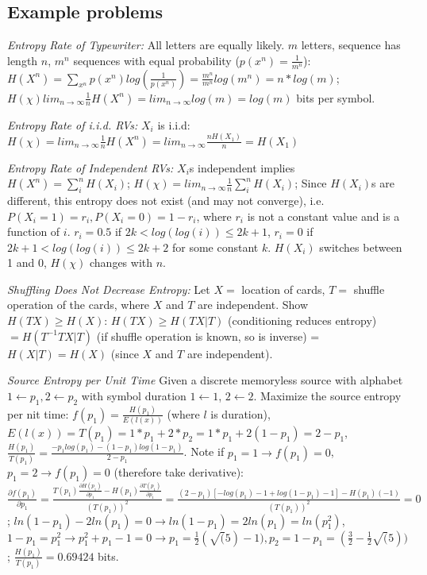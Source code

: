\documentclass[10pt]{article}
\begin{document}
\begin{tiny}
\begin{multicols}{3}
\section*{Example problems}

\textit{Entropy Rate of Typewriter:} 
All letters are equally likely. 
$m$ letters, sequence has length $n$, 
$m^n$ sequences with equal probability ($p(x^n) = \frac{1}{m^n}$): 
$H(X^n) = \sum_{x^n} p(x^n) log(\frac{1}{p(x^n)}) =  \frac{m^n}{m^n}log(m^n) = n*log(m)$; $H(\chi) lim_{n \to \infty} \frac{1}{n} H(X^n) = lim_{n \to \infty} log(m) = log(m)$ bits per symbol.

\textit{Entropy Rate of i.i.d. RVs:} 
$X_i$ is i.i.d: 
$H(\chi) = lim_{n \to \infty} \frac{1}{n} H(X^n) = lim_{n \to \infty} \frac{nH(X_1)}{n} = H(X_1)$

\textit{Entropy Rate of Independent RVs:} 
$X_i$s independent implies $H(X^n) = \sum_i^n H(X_i)$; 
$H(\chi) = lim_{n \to \infty} \frac{1}{n} \sum_i^n H(X_i) $; 
Since $H(X_i)$s are different, 
this entropy does not exist (and may not converge), 
i.e. $P(X_i = 1) = r_i, P(X_i = 0) = 1 - r_i$, 
where $r_i$ is not a constant value and is a function of $i$. 
$r_i = 0.5$ if $2k < log(log(i)) \leq 2k + 1$, $r_i = 0$ if $2k + 1 < log(log(i)) \leq 2k +2 $ for some constant $k$. $H(X_i)$ switches between 1 and 0, $H(\chi)$ changes with $n$.

\textit{Shuffling Does Not Decrease Entropy:} 
Let $X =$ location of cards, $T =$ shuffle operation of the cards, 
where $X$ and $T$ are independent. Show $H(TX) \geq H(X)$: $H(TX) \geq H(TX|T)$ (conditioning reduces entropy) $= H(T^{-1}TX|T)$ (if shuffle operation is known, so is inverse) = $H(X|T) = H(X)$ (since $X$ and $T$ are independent).

\textit{Source Entropy per Unit Time} 
Given a discrete memoryless source with alphabet $1 \gets p_1, 2 \gets p_2$ with symbol duration $1 \gets 1$, $2 \gets 2$. 
Maximize the source entropy per nit time: $f(p_1) = \frac{H(p_1)}{E(l(x))}$ (where $l$ is duration), $E(l(x)) = T(p_1) = 1*p_1 + 2*p_2 = 1*p_1 + 2(1-p_1) = 2 - p_1$, $\frac{H(p_1)}{T(p_1)} = \frac{-p_1 log(p_1) - (1-p_1)log(1-p_1)}{2-p_1}$. Note if $p_1 = 1 \to f(p_1) = 0$, $p_1 = 2 \to f(p_1) = 0$ 
(therefore take derivative): $\frac{\partial f(p_1)}{\partial p_1} = \frac{ T(p_1)\frac{\partial H(p_1)}{\partial p_1} - H(p_1)\frac{\partial T(p_1)}{\partial p_1}}{(T(p_1))^2} = \frac{(2-p_1)[-log(p_1) -1 + log(1-p_1) - 1] - H(p_1)(-1)}{(T(p_1))^2}=0$; $ln(1-p_1) - 2ln(p_1) = 0 \to ln(1-p_1) = 2ln(p_1) = ln(p_1^2)$, $1-p_1 = p_1^2 \to p_1^2 + p_1 - 1 = 0 \to p_1 = \frac{1}{2}(\sqrt(5) - 1), p_2 = 1 - p_1 = (\frac{3}{2} - \frac{1}{2}\sqrt(5))$; $\frac{H(p_1)}{T(p_1)} = 0.69424$ bits. 


\end{multicols}
\end{tiny}
\end{document}
